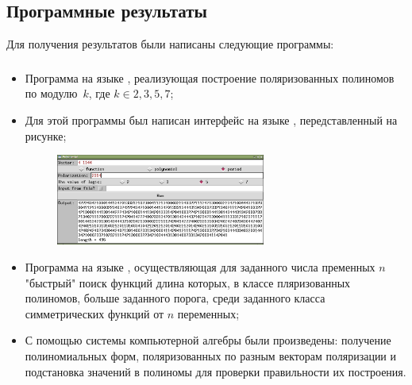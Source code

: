 \documentclass[t]{beamer}
\begin{document}
\subsection{Программные результаты}
\begin{frame}
Для получения результатов были написаны следующие программы:
\frametitle{\insertsection}
\framesubtitle{\insertsubsection}
 {
\begin{itemize}
\item Программа на языке , реализующая построение поляризованных полиномов по
    модулю~$k$, где $k \in {2,3,5,7}$;
\item Для этой программы был написан интерфейс на языке , передставленный на
    рисунке;
    \begin{figure}[h]
    \centering
    \includegraphics[width=0.65\textwidth]{polyscreen.png}
    \end{figure}
\end{itemize}
}
 {
\begin{itemize}
\item Программа на языке , осуществляющая для заданного числа пременных $n$
    "быстрый"{} поиск функций длина которых, в классе пляризованных полиномов, больше заданного
    порога, среди заданного класса симметрических функций от $n$ переменных;
\item С помощью системы компьютерной алгебры  были произведены: получение
    полиномиальных форм, поляризованных по разным векторам поляризации и подстановка значений в
    полиномы для проверки правильности их построения.
\end{itemize}
}
\end{frame}
\end{document}
